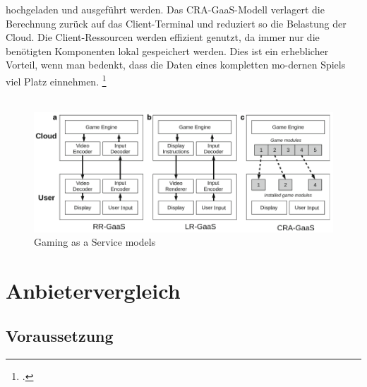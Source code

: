 \documentclass[12pt,toc=bib,toc=listof]{scrreprt}
\begin{document}
hochgeladen und ausgeführt werden. Das CRA-GaaS-Modell verlagert die Berechnung zurück auf das Client-Terminal und reduziert so die Belastung der Cloud. Die Client-Ressourcen werden effizient 
genutzt, da immer nur die benötigten Komponenten lokal gespeichert werden. Dies ist ein erheblicher Vorteil, wenn man bedenkt, dass die Daten eines kompletten mo-dernen Spiels viel Platz einnehmen.
\footcite [Vgl.] [] {Dangelo.2015}
\\ \\
\begin{figure}[h]
  \centering
  \includegraphics[scale=0.9]{Abbildungen/GaaS_1.png} 
  \caption[D’Angelo, Ferretti and Marzolla (2022)]{Gaming as a Service models}
\end{figure}

\section{Anbietervergleich}
\label{sec:Anbietervergleich}


\subsection{Voraussetzung}
\label{sec:Vorraussetzung}
\end{document}
